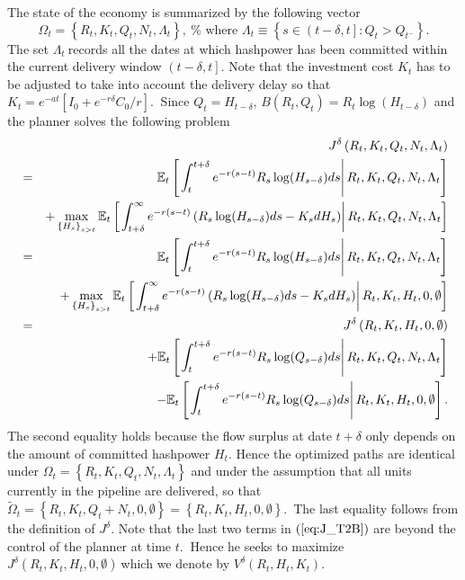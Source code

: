 \documentclass[12pt, a4paper]{article}
\begin{document}
The state of the economy is summarized by the following vector%
\begin{equation*}
\Omega _{t}=\left\{ R_{t},K_{t},Q_{t},N_{t},\Lambda _{t}\right\} ,\ \text{%
where\ }\Lambda _{t}\equiv \left\{ s\in \left( t-\delta ,t\right]
:Q_{t}>Q_{t^{-}}\right\} .
\end{equation*}%
The set $\Lambda _{t}\ $records all the dates at which hashpower has been
committed within the current delivery window $\left( t-\delta ,t\right] .$
Note that the investment cost $K_{t}$ has to be adjusted to take into
account the delivery delay so that $K_{t}=e^{-at }\left[I_{0}+e^{-r\delta }C_{0}/r\right].\ $%
Since $Q_{t}=H_{t-\delta }$, $B\left( R_{t},Q_{t}\right) =R_{t}\log
(H_{t-\delta })$ and the planner solves the following problem%
\begin{eqnarray}
&&J^{\delta }\left( R_{t},K_{t},Q_{t},N_{t},\Lambda _{t}\right)   \notag \\
&=&\mathbb{E}_{t}\left[ \left. \int_{t}^{t+\delta }e^{-r(s-t)}R_{s}\log
(H_{s-\delta })ds\right\vert R_{t},K_{t},Q_{t},N_{t},\Lambda _{t}\right]
\notag \\
&&+\max_{\left\{ H_{s}\right\} _{s>t}}\mathbb{E}_{t}\left[ \left.
\int_{t+\delta }^{\infty }e^{-r(s-t)}\left( R_{s}\log (H_{s-\delta
})ds-K_{s}dH_{s}\right) \right\vert R_{t},K_{t},Q_{t},N_{t},\Lambda _{t}%
\right]   \notag \\
&=&\mathbb{E}_{t}\left[ \left. \int_{t}^{t+\delta }e^{-r(s-t)}R_{s}\log
(H_{s-\delta })ds\right\vert R_{t},K_{t},Q_{t},N_{t},\Lambda _{t}\right]
\notag \\
&&+\max_{\left\{ H_{s}\right\} _{s>t}}\mathbb{E}_{t}\left[ \left.
\int_{t+\delta }^{\infty }e^{-r(s-t)}\left( R_{s}\log (H_{s-\delta
})ds-K_{s}dH_{s}\right) \right\vert R_{t},K_{t},H_{t},0,\emptyset \right]
\notag \\
&=&J^{\delta }\left( R_{t},K_{t},H_{t},0,\emptyset \right)   \notag \\
&&+\mathbb{E}_{t}\left[ \left. \int_{t}^{t+\delta }e^{-r(s-t)}R_{s}\log
(Q_{s-\delta })ds\right\vert R_{t},K_{t},Q_{t},N_{t},\Lambda _{t}\right]
\notag \\
&&-\mathbb{E}_{t}\left[ \left. \int_{t}^{t+\delta }e^{-r(s-t)}R_{s}\log
(Q_{s-\delta })ds\right\vert R_{t},K_{t},H_{t},0,\emptyset \right] .
\label{eq:J_T2B}
\end{eqnarray}
The second equality holds because the flow surplus at date $t+\delta $ only
depends on the amount of committed hashpower $H_{t}$. Hence the optimized
paths are identical under $\Omega _{t}=\left\{
R_{t},K_{t},Q_{t},N_{t},\Lambda _{t}\right\} $ and under the assumption that
all units currently in the pipeline are delivered, so that $\tilde{\Omega}%
_{t}=\left\{ R_{t},K_{t},Q_{t}+N_{t},0,\emptyset \right\} =\left\{
R_{t},K_{t},H_{t},0,\emptyset \right\} $.\ The last equality follows from
the definition of $J^{\delta }$. Note that the last two terms in $\left( \ref%
{eq:J_T2B}\right) $ are beyond the control of the planner at time $t.\ $%
Hence he seeks to maximize $J^{\delta }\left( R_{t},K_{t},H_{t},0,\emptyset
\right) \ $which we denote by $V^{\delta }\left( R_{t},H_{t},K_{t}\right) $.
\end{document}
